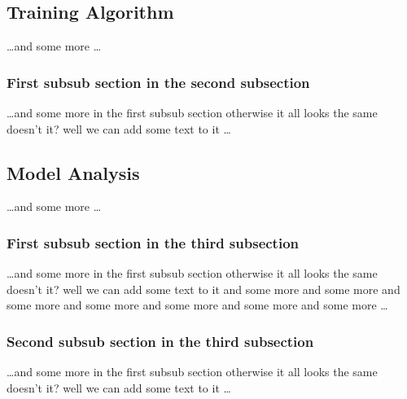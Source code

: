 \subsection{Training Algorithm}
\dots and some more \dots

\subsubsection{First subsub section in the second subsection}
\dots and some more in the first subsub section otherwise it all looks the same
doesn't it? well we can add some text to it \dots

\subsection{Model Analysis}
\dots and some more \dots

\subsubsection{First subsub section in the third subsection}
\dots and some more in the first subsub section otherwise it all looks the same
doesn't it? well we can add some text to it and some more and some more and
some more and some more and some more and some more and some more \dots

\subsubsection{Second subsub section in the third subsection}
\dots and some more in the first subsub section otherwise it all looks the same
doesn't it? well we can add some text to it \dots


